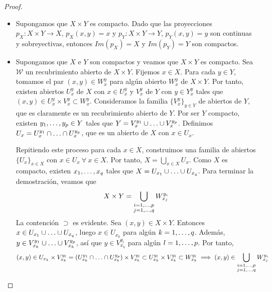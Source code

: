 \documentclass[12pt]{report}
\theoremstyle{definition}
\theoremstyle{definition}
\theoremstyle{remark}
\begin{document}
\begin{proof}
\hfill
\begin{itemize}
    \item[{\fbox[rb]{$\Rightarrow$}}] Supongamos que $X \times Y$ es compacto. Dado que las proyecciones $p_X \colon X \times Y \to X$, $p_X(x,y) = x$ y $p_Y \colon X \times Y \to Y$, $p_Y(x,y) = y$ son continuas y sobreyectivas, entonces $Im(p_X) = X$ y $Im(p_Y) = Y$ son compactos.
    \item[{\fbox[rb]{$\Leftarrow$}}] Supongamos que $X$ e $Y$ son compactos y veamos que $X \times Y$ es compacto. Sea $\mathcal{W}$ un recubrimiento abierto de $X \times Y$. Fijemos $x \in X$. Para cada $y \in Y$, tomamos el par $\displaystyle (x,y) \in W_x^y$ para algún abierto $\displaystyle W_x^y$ de $X \times Y$. Por tanto, existen abiertos $\displaystyle U_x^y$ de $X$ con $\displaystyle x \in U_x^y$ y $\displaystyle V_x^y$ de $Y$ con $\displaystyle y \in Y_x^y$ tales que $\displaystyle (x,y) \in U_x^y \times V_x^y \subset W_x^y$. Consideramos la familia $\displaystyle \{V_x^y\}_{y \in Y}$ de abiertos de $Y$, que es claramente es un recubrimiento abierto de $Y$. Por ser $Y$ compacto, existen $y_1,\mathellipsis,y_p \in Y$ tales que $\displaystyle Y = V_x^{y_1} \cup \mathellipsis \cup V_x^{y_p}$. Definimos $\displaystyle U_x = U_x^{y_1} \cap \mathellipsis \cap U_x^{y_p}$, que es un abierto de $X$ con $x \in U_x$.

    \vspace{2mm}
    Repitiendo este proceso para cada $x \in X$, construimos una familia de abiertos $\{U_x\}_{x \in X}$ con $x \in U_x \ \forall \ x \in X$. Por tanto, $X = \bigcup_{x \in X}U_x$. Como $X$ es compacto, existen $x_1,\mathellipsis,x_q$ tales que $X = U_{x_1} \cup \mathellipsis \cup U_{x_q}$. Para terminar la demostración, veamos que 
    \[X \times Y = \bigcup_{\substack{i = 1,\mathellipsis,p \\ j = 1,\mathellipsis,q}}W_{x_j}^{y_i}\]
    La contención $\supset$ es evidente. Sea $(x,y) \in X \times Y$. Entonces $x \in U_{x_1} \cup \mathellipsis \cup U_{x_q}$, luego $x \in U_{x_k}$ para algún $k = 1, \mathellipsis,q$. Además, $\displaystyle y \in V_{x_k}^{y_1} \cup \mathellipsis \cup V_{x_k}^{y_p}$, así que $\displaystyle y \in V_{x_k}^{y_l}$ para algún $l = 1,\mathellipsis,p$. Por tanto, 
    \[(x,y) \in U_{x_k} \times V_{x_k}^{y_l} = (U_{x_k}^{y_1} \cap \mathellipsis \cap U_{x_k}^{y_p}) \times V_{x_k}^{y_l} \subset U_{x_k}^{y_l} \times V_{x_k}^{y_l} \subset W_{x_k}^{y_l} \implies (x,y) \in \bigcup_{\substack{i = 1,\mathellipsis,p \\ j = 1,\mathellipsis,q}}W_{x_j}^{y_i}\]
\end{itemize}
\end{proof}
\end{document}
